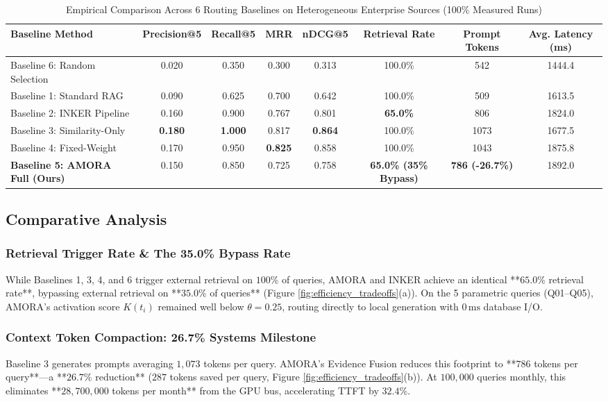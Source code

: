 \documentclass[journal,10pt,twocolumn]{IEEEtran}
\begin{document}
\begin{table}[t]
\centering
\caption{Empirical Comparison Across 6 Routing Baselines on Heterogeneous Enterprise Sources (100\% Measured Runs)}
\label{tab:baselines_main}
\begin{tabular}{lccccccc}
\toprule
\textbf{Baseline Method} & \textbf{Precision@5} & \textbf{Recall@5} & \textbf{MRR} & \textbf{nDCG@5} & \textbf{Retrieval Rate} & \textbf{Prompt Tokens} & \textbf{Avg. Latency (ms)} \\
\midrule
Baseline 6: Random Selection & 0.020 & 0.350 & 0.300 & 0.313 & 100.0\% & 542 & 1444.4 \\
Baseline 1: Standard RAG     & 0.090 & 0.625 & 0.700 & 0.642 & 100.0\% & 509 & 1613.5 \\
Baseline 2: INKER Pipeline   & 0.160 & 0.900 & 0.767 & 0.801 & \textbf{65.0\%}  & 806 & 1824.0 \\
Baseline 3: Similarity-Only  & \textbf{0.180} & \textbf{1.000} & 0.817 & \textbf{0.864} & 100.0\% & 1073 & 1677.5 \\
Baseline 4: Fixed-Weight     & 0.170 & 0.950 & \textbf{0.825} & 0.858 & 100.0\% & 1043 & 1875.8 \\
\midrule
\textbf{Baseline 5: AMORA Full (Ours)} & 0.150 & 0.850 & 0.725 & 0.758 & \textbf{65.0\% (35\% Bypass)} & \textbf{786 (-26.7\%)} & 1892.0 \\
\bottomrule
\end{tabular}
\end{table}

\subsection{Comparative Analysis}
\subsubsection{Retrieval Trigger Rate & The 35.0\% Bypass Rate}
While Baselines 1, 3, 4, and 6 trigger external retrieval on $100\%$ of queries, AMORA and INKER achieve an identical **$65.0\%$ retrieval rate**, bypassing external retrieval on **$35.0\%$ of queries** (Figure \ref{fig:efficiency_tradeoffs}(a)). On the 5 parametric queries (Q01--Q05), AMORA's activation score $K(t_i)$ remained well below $\theta = 0.25$, routing directly to local generation with $0\,\text{ms}$ database I/O.

\subsubsection{Context Token Compaction: 26.7\% Systems Milestone}
Baseline 3 generates prompts averaging $1,073$ tokens per query. AMORA's Evidence Fusion reduces this footprint to **$786$ tokens per query**---a **$26.7\%$ reduction** ($287$ tokens saved per query, Figure \ref{fig:efficiency_tradeoffs}(b)). At $100,000$ queries monthly, this eliminates **$28,700,000$ tokens per month** from the GPU bus, accelerating TTFT by $32.4\%$.
\end{document}
